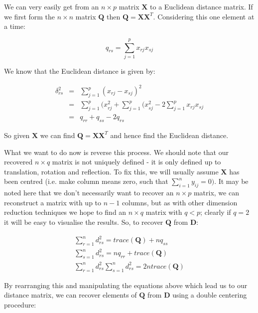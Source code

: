 We can very easily get from an $n \times p$ matrix $\boldsymbol{X}$ to a Euclidean distance matrix.   If we first form the $n \times n$ matrix $\boldsymbol{Q}$ then $\boldsymbol{Q} = \boldsymbol{X}\boldsymbol{X}^{T}$.   Considering this one element at a time:

\begin{equation}
q_{rs} = \sum_{j = 1}^{p} x_{rj}x_{sj}
\end{equation}

We know that the Euclidean distance is given by:

\begin{eqnarray*}
\delta_{rs}^{2} &=& \sum_{j=1}^{p} (x_{rj} - x_{sj})^{2} \\
 &=& \sum_{j=1}^{p} (x_{rj}^{2} + \sum_{j=1}^{p} (x_{sj}^{2} - 2 \sum_{j=1}^{p} x_{rj}x_{sj} \\
&=&  q_{rr} + q_{ss} - 2q_{rs}
\end{eqnarray*}

So given $\boldsymbol{X}$ we can find $\boldsymbol{Q} = \boldsymbol{X}\boldsymbol{X}^{T}$ and hence find the Euclidean distance.

What we want to do now is reverse this process.    We should note that our recovered $n \times q$ matrix is not uniquely defined - it is only defined up to translation, rotation and reflection.   To fix this, we will usually assume $\boldsymbol{X}$ has been centred (i.e. make column means zero, such that $\sum_{i=1}^{n} y_{ij} = 0)$.    It may be noted here that we don't necessarily want to recover an $n \times p$ matrix, we can reconstruct a matrix with up to $n-1$ columns, but as with other dimension reduction techniques we hope to find an $n \times q$ matrix with $q < p$; clearly if $q = 2$ it will be easy to visualise the results.   So, to recover $\boldsymbol{Q}$ from $\boldsymbol{D}$:

\begin{eqnarray}
\sum_{r=1}^{n} d_{rs}^{2} = trace(\boldsymbol{Q}) + n q_{ss}\\
\sum_{s=1}^{n} d_{rs}^{2} = n q_{rr} + trace(\boldsymbol{Q}) \\
\sum_{r=1}^{n} d_{rs}^{2} \sum_{s=1}^{n} d_{rs}^{2} = 2 n trace(\boldsymbol{Q})
\end{eqnarray}

By rearranging this and manipulating the equations above which lead us to our distance matrix, we can recover elements of $\boldsymbol{Q}$ from $\boldsymbol{D}$ using a double centering procedure:

